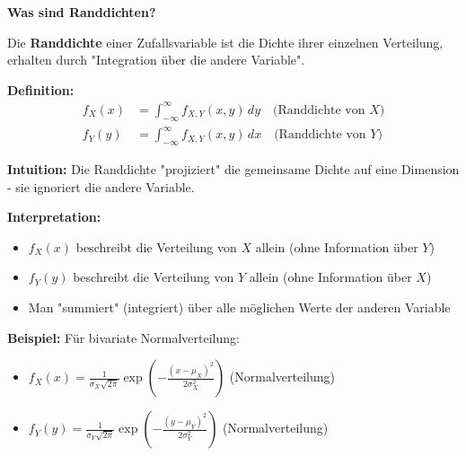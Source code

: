 \begin{denoobification}
\begin{center}
\end{center}
\end{denoobification}

\begin{denoobification}
\textbf{Was sind Randdichten?}

Die \textbf{Randdichte} einer Zufallsvariable ist die Dichte ihrer einzelnen Verteilung, erhalten durch "Integration über die andere Variable".

\textbf{Definition:}
\begin{align}
f_X(x) &= \int_{-\infty}^{\infty} f_{X,Y}(x,y) \, dy \quad \text{(Randdichte von $X$)} \\
f_Y(y) &= \int_{-\infty}^{\infty} f_{X,Y}(x,y) \, dx \quad \text{(Randdichte von $Y$)}
\end{align}

\textbf{Intuition:} Die Randdichte "projiziert" die gemeinsame Dichte auf eine Dimension - sie ignoriert die andere Variable.

\textbf{Interpretation:}
\begin{itemize}
    \item $f_X(x)$ beschreibt die Verteilung von $X$ allein (ohne Information über $Y$)
    \item $f_Y(y)$ beschreibt die Verteilung von $Y$ allein (ohne Information über $X$)
    \item Man "summiert" (integriert) über alle möglichen Werte der anderen Variable
\end{itemize}

\textbf{Beispiel:} Für bivariate Normalverteilung:
\begin{itemize}
    \item $f_X(x) = \frac{1}{\sigma_X\sqrt{2\pi}} \exp\left(-\frac{(x-\mu_X)^2}{2\sigma_X^2}\right)$ (Normalverteilung)
    \item $f_Y(y) = \frac{1}{\sigma_Y\sqrt{2\pi}} \exp\left(-\frac{(y-\mu_Y)^2}{2\sigma_Y^2}\right)$ (Normalverteilung)
\end{itemize}


\end{denoobification}
